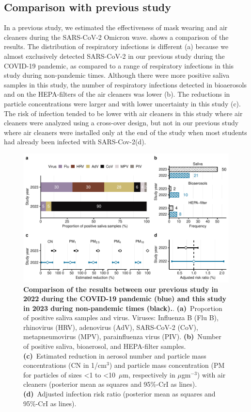 \documentclass[fleqn,11pt]{wlscirep}
\begin{document}
\subsection{Comparison with previous study}

In a previous study\cite{Banholzer2023PLoSMed}, we estimated the effectiveness of mask wearing and air cleaners during the SARS-CoV-2 Omicron wave.  shows a comparison of the results. The distribution of respiratory infections is different (a) because we almost exclusively detected SARS-CoV-2 in our previous study during the COVID-19 pandemic, as compared to a range of respiratory infections in this study during non-pandemic times. Although there were more positive saliva samples in this study, the number of respiratory infections detected in bioaerosols and on the HEPA-filters of the air cleaners was lower (b).
The reductions in particle concentrations were larger and with lower uncertainty in this study (c). The risk of infection tended to be lower with air cleaners in this study where air cleaners were analyzed using a cross-over design, but not in our previous study where air cleaners were installed only at the end of the study when most students had already been infected with SARS-Cov-2(d).

\begin{figure}[!htpb]
    \includegraphics[width=\linewidth]{../../results/comparison.pdf} 
    \caption{\textbf{Comparison of the results between our previous study in 2022 during the COVID-19 pandemic (blue) and this study in 2023 during non-pandemic times (black).}. \textbf{(a)}~Proportion of positive saliva samples and virus. Viruses: Influenza B (Flu B), rhinovirus (HRV), adenovirus (AdV), SARS-CoV-2 (CoV), metapneumovirus (MPV), parainfluenza virus (PIV). \textbf{(b)}~Number of positive saliva, bioaerosol, and HEPA-filter samples. \textbf{(c)}~Estimated reduction in aerosol number and particle mass concentrations (CN in 1/cm$^3$) and particle mass concentration (PM for particles of sizes <1 to <10~$\mu$m, respectively in $\mu$gm$^{-3}$) with air cleaners (posterior mean as squares and 95\%-CrI as lines). \textbf{(d)}~Adjusted infection risk ratio (posterior mean as squares and 95\%-CrI as lines).}
    \label{fig:comparison}
\end{figure}
\end{document}
